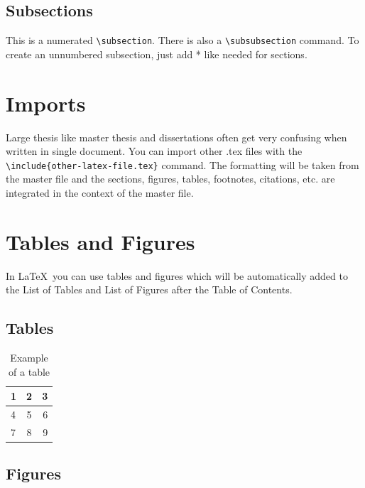 \documentclass[bachelorarbeit,grey,english]{mas-thesis-sections}				%
\begin{document}
\subsection{Subsections}

This is a numerated {\tt \textbackslash subsection}. There is also a {\tt \textbackslash subsubsection} command. To create an unnumbered subsection, just add * like needed for sections.

\newpage

\section{Imports}

Large thesis like master thesis and dissertations often get very confusing when written in single document. You can import other .tex files with the {\tt \textbackslash include\{other-latex-file.tex\}} command. The formatting will be taken from the master file and the sections, figures, tables, footnotes, citations, etc. are integrated in the context of the master file.

\newpage


\section{Tables and Figures}

In \LaTeX\ you can use tables and figures which will be automatically added to the List of Tables and List of Figures after the Table of Contents.

\subsection{Tables}

\begin{table}[ht]
\begin{center}
	\begin{tabular}{ l | c | r }
		1 & 2 & 3 \\
		\hline
		4 & 5 & 6 \\
		7 & 8 & 9 \\
	\end{tabular}
	\caption{Example of a table}
	\label{table:1}
\end{center}
\end{table}

\subsection{Figures}
\end{document}
